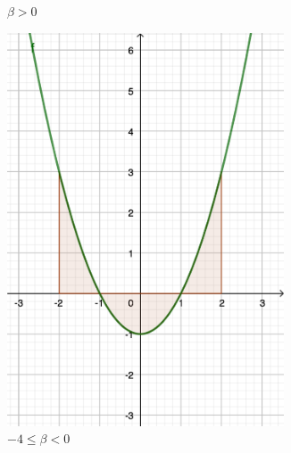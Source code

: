 \documentclass{article}
\begin{document}
\begin{enumerate}[label=\textbf{Esercizio 11.\arabic*.},itemindent=*]
\begin{figure}[h]
\begin{subfigure}{0.27\textwidth}
        \caption{$\beta>0$}
        \label{subfig:caso1}
    \end{subfigure}
    \begin{subfigure}{0.27\textwidth}
        \centering
        \includegraphics[width=0.9\textwidth]{src/caso2.png}
        \caption{$-4\leq\beta<0$}
        \label{fig:caso2}
    \end{subfigure}
    \begin{subfigure}{0.27\textwidth}
        \centering

\end{subfigure}
\end{figure}
\end{enumerate}
\end{document}
